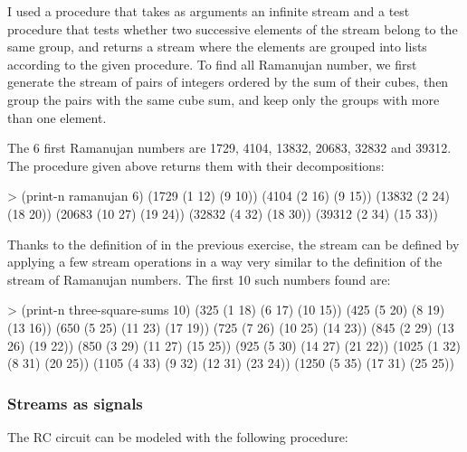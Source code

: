 \begin{exe}[3.71]
    I used a procedure  that takes as arguments an infinite 
    stream and a test procedure  that tests whether two 
    successive elements of the stream belong to the same group, and returns 
    a stream where the elements are grouped into lists according to the given 
    procedure. To find all Ramanujan number, we first generate the stream of 
    pairs of integers ordered by the sum of their cubes, then group the pairs 
    with the same cube sum, and keep only the groups with more than one element.

    The 6 first Ramanujan numbers are 1729, 4104, 13832, 20683, 32832 and 39312. 
    The procedure given above returns them with their decompositions:
    \begin{cscm}
        > (print-n ramanujan 6)
        (1729 (1 12) (9 10))
        (4104 (2 16) (9 15))
        (13832 (2 24) (18 20))
        (20683 (10 27) (19 24))
        (32832 (4 32) (18 30))
        (39312 (2 34) (15 33))
    \end{cscm}
\end{exe}

\begin{exe}[3.72]
    Thanks to the definition of  in the previous exercise, the 
    stream can be defined by applying a few stream operations in a way very 
    similar to the definition of the stream of Ramanujan numbers.
    The first 10 such numbers found are:
    \begin{cscm}
        > (print-n three-square-sums 10)
        (325 (1 18) (6 17) (10 15))
        (425 (5 20) (8 19) (13 16))
        (650 (5 25) (11 23) (17 19))
        (725 (7 26) (10 25) (14 23))
        (845 (2 29) (13 26) (19 22))
        (850 (3 29) (11 27) (15 25))
        (925 (5 30) (14 27) (21 22))
        (1025 (1 32) (8 31) (20 25))
        (1105 (4 33) (9 32) (12 31) (23 24))
        (1250 (5 35) (17 31) (25 25))
    \end{cscm}
\end{exe}

\subsubsection{Streams as signals}

\begin{exe}[3.73]
    The RC circuit can be modeled with the following procedure:
\end{exe}

